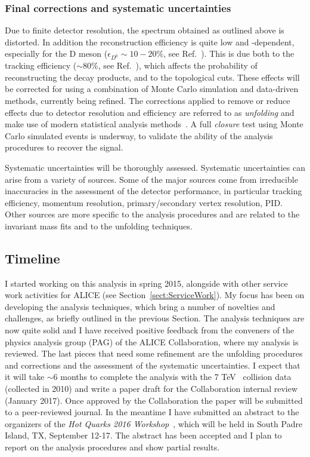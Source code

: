 \documentclass[12pt, a4paper, twoside, titlepage]{article}
\begin{document}
\subsubsection{Final corrections and systematic uncertainties}
Due to finite detector resolution, the spectrum obtained as outlined above is distorted. In addition the reconstruction efficiency is quite low
and \pt-dependent, especially for the D meson ($\epsilon_{D^0} \sim 10-20\%$, see Ref.~\cite{ALICE:2012d}). This is due both to the tracking efficiency ($\sim 80\%$, see Ref.~\cite{ALICE:2014b}),
which affects the probability of reconstructing the decay products, and to the topological cuts. These effects will be corrected for using a combination of Monte Carlo simulation and data-driven methods, currently being refined.
The corrections applied to remove or reduce effects due to detector resolution and efficiency are referred to as \emph{unfolding} and make use of modern statistical analysis methods~\cite{Hocker:1995, Dagostini:1995}.
A full \emph{closure} test using Monte Carlo simulated events is underway, to validate the ability of the analysis procedures to recover the signal.

Systematic uncertainties will be thoroughly assessed. Systematic uncertainties can arise from a variety of sources.
Some of the major sources come from irreducible inaccuracies in the assessment of the detector performance, in particular tracking efficiency, 
momentum resolution, primary/secondary vertex resolution, PID.
Other sources are more specific to the analysis procedures and are related to the invariant mass fits and to the unfolding techniques.

\subsection{Timeline}
I started working on this analysis in spring 2015, alongside with other service work activities for ALICE (see Section~\ref{sect:ServiceWork}).
My focus has been on developing the analysis techniques, which bring a number of novelties and challenges, as briefly outlined in the previous Section.
The analysis techniques are now quite solid and I have received positive feedback from the conveners of the physics analysis group (PAG) of the ALICE Collaboration,
where my analysis is reviewed. The last pieces that need some refinement are the unfolding procedures and corrections and the assessment of the systematic uncertainties.
I expect that it will take $\sim 6$ months to complete the analysis with the 7 TeV \pp\ collision data (collected in 2010) and write a paper draft for the Collaboration internal review (January 2017). Once approved
by the Collaboration the paper will be submitted to a peer-reviewed journal.
In the meantime I have submitted an abstract to the organizers of the \emph{Hot Quarks 2016 Workshop}~\cite{HotQuarks:2016}, which will be held in South Padre Island, TX, September 12-17. 
The abstract has been accepted and I plan to report on the analysis procedures and show partial results.
\end{document}
